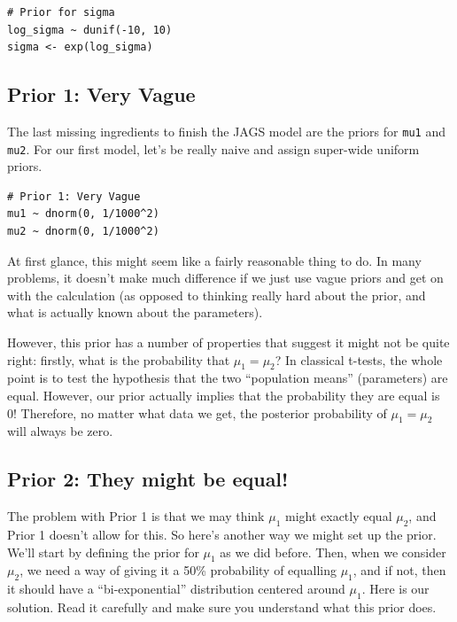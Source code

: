 \begin{verbatim}
# Prior for sigma
log_sigma ~ dunif(-10, 10)
sigma <- exp(log_sigma)
\end{verbatim}

\subsection{Prior 1: Very Vague}
The last missing ingredients to finish the JAGS model are the priors for
{\tt mu1} and {\tt mu2}. For our first model, let's be really naive and assign
super-wide uniform priors.

\begin{verbatim}
# Prior 1: Very Vague
mu1 ~ dnorm(0, 1/1000^2)
mu2 ~ dnorm(0, 1/1000^2)
\end{verbatim}

At first glance, this might seem like a fairly reasonable thing to do. In many
problems, it doesn't make much difference if we just use vague priors and get
on with the calculation (as opposed to thinking really hard about the prior,
and what is actually known about the parameters).

However, this prior has a number of properties that suggest it might not be
quite right: firstly, what is the probability that $\mu_1 = \mu_2$?
In classical t-tests, the whole point is to test the hypothesis that
the two ``population means'' (parameters) are equal. However, our prior
actually implies that the probability they are equal is 0! Therefore, no matter
what data we get, the posterior probability of $\mu_1 = \mu_2$ will always be
zero.

\subsection{Prior 2: They might be equal!}
The problem with Prior 1 is that we may think $\mu_1$ might exactly equal
$\mu_2$, and Prior 1 doesn't allow for this. So here's another way we might
set up the prior. We'll start by defining the prior for $\mu_1$ as we did
before. Then, when we consider $\mu_2$, we need a way of giving it a
50\% probability of equalling $\mu_1$, and if not, then it should have
a ``bi-exponential'' distribution centered around $\mu_1$.
Here is our solution. Read it carefully and make sure you understand what this
prior does.

